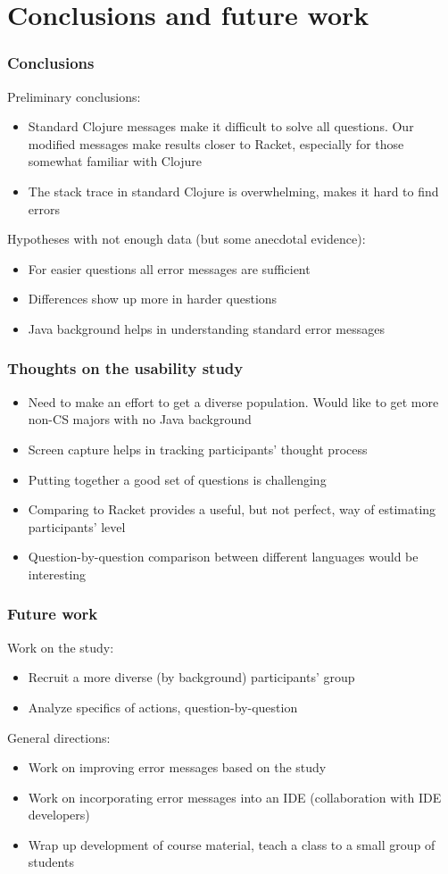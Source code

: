 \documentclass{beamer}
\begin{document}
\section{Conclusions and future work}

\frametitle{Conclusions}

\begin{frame}
Preliminary conclusions:
\begin{itemize}
\item Standard Clojure messages make it difficult to solve all questions. Our modified messages make results closer to Racket, especially for 
those somewhat familiar with Clojure
\item The stack trace in standard Clojure is overwhelming, makes it hard to find errors 
\end{itemize}
Hypotheses with not enough data (but some anecdotal evidence):
\begin{itemize}
\item For easier questions all error messages are sufficient
\item Differences show up more in harder questions 
\item Java background helps in understanding standard error messages
\end{itemize}
\end{frame}

\begin{frame}
\frametitle{Thoughts on the usability study}
\begin{itemize}
\item Need to make an effort to get a diverse population. Would like to get more non-CS majors with no Java background
\item Screen capture helps in tracking participants' thought process
\item Putting together a good set of questions is challenging
\item Comparing to Racket provides a useful, but not perfect, way of estimating participants' level 
\item Question-by-question comparison between different languages would be interesting
\end{itemize}
\end{frame}

\begin{frame}
\frametitle{Future work}
Work on the study:
\begin{itemize}
\item Recruit a more diverse (by background) participants' group
\item Analyze specifics of actions, question-by-question
\end{itemize}
General directions:
\begin{itemize}
\item Work on improving error messages based on the study
\item Work on incorporating error messages into an IDE (collaboration with IDE developers)
\item Wrap up development of course material, teach a class to a small group of students 
\end{itemize}
\end{frame}
\end{document}

